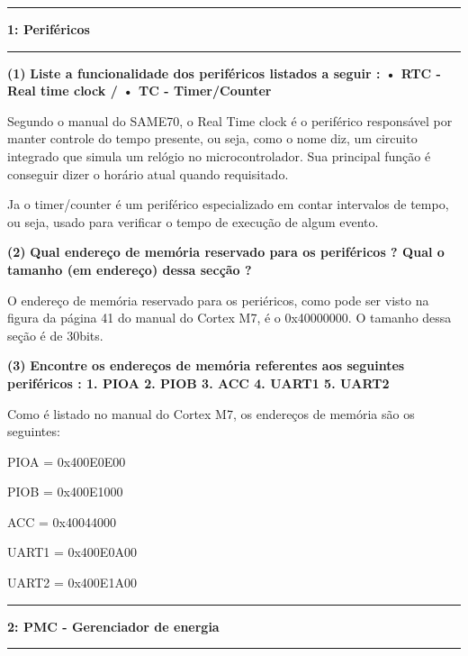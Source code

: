 \documentclass[11pt]{article}
\newcommand\question[2]{\vspace{.25in}\hrule\textbf{#1: #2}\vspace{.5em}\hrule\vspace{.10in}}
\renewcommand\part[1]{\vspace{.10in}\textbf{(#1)}}
\newcommand\perifericos{\vspace{.10in}\textbf{Liste a funcionalidade dos periféricos listados a seguir :
		• RTC - Real time clock /
		• TC - Timer/Counter}}
\newcommand\memoria{\vspace{.10in}\textbf{Qual endereço de memória reservado para os periféricos
		? Qual o tamanho (em endereço) dessa secção ?}}
\newcommand\perifericostwo{\vspace{.10in}\textbf{Encontre os endereços de memória referentes aos seguintes
		periféricos :
		1. PIOA
		2. PIOB
		3. ACC
		4. UART1
		5. UART2}}
\begin{document}
\raggedright
\newcommand\NAME{Marcelo G de Andrade}  %
\newcommand\HWNUM{1}              %


\question{1}{Periféricos}

\part{1} 
\perifericos

\RaggedRight 
Segundo o manual do SAME70, o Real Time clock é o periférico responsável por manter controle do tempo presente, ou seja, como o nome diz, um circuito integrado que simula um relógio no microcontrolador. Sua principal função é conseguir dizer o horário atual quando requisitado.

Ja o timer/counter é um periférico especializado em contar intervalos de tempo, ou seja, usado para verificar o tempo de execução de algum evento.

\raggedright
\part{2} 
\memoria

O endereço de memória reservado para os periéricos, como pode ser visto na figura da página 41 do manual do Cortex M7, é o 0x40000000. O tamanho dessa seção é de 30bits.

\raggedright
\part{3} 
\perifericostwo

\RaggedRight
Como é listado no manual do Cortex M7, os endereços de memória são os seguintes:

PIOA = 0x400E0E00

PIOB = 0x400E1000

ACC = 0x40044000

UART1 = 0x400E0A00

UART2 = 0x400E1A00


\raggedright
\question{2}{PMC - Gerenciador de energia}
\end{document}
